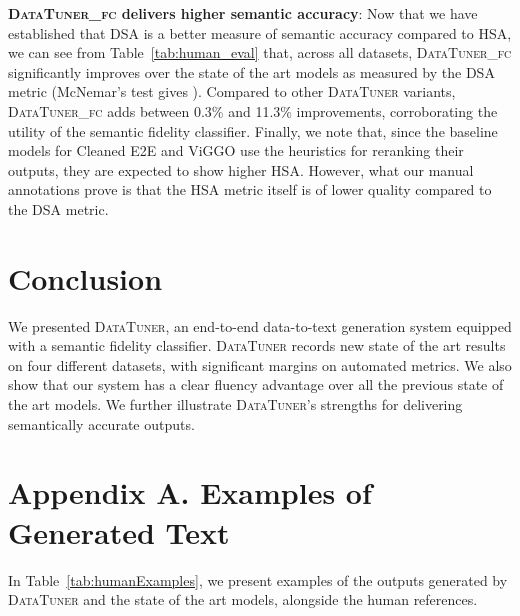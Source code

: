 \documentclass[11pt]{article}
\newcommand{\viggo}{ViGGO\xspace}
\newcommand{\cleanedee}{Cleaned E2E\xspace}
\newcommand{\system}{\textsc{DataTuner}\xspace}
\newcommand{\systemFcPost}{\textsc{DataTuner\_fc}\xspace}
\theoremstyle{definition}
\theoremstyle{break}
\begin{document}
\textbf{\systemFcPost delivers higher semantic accuracy}: 
Now that we have established that DSA is a better measure of semantic accuracy compared to HSA, we can see from Table~\ref{tab:human_eval} that, across all datasets, \systemFcPost significantly improves over the state of the art models as measured by the DSA metric (McNemar's test gives ). Compared to other \system variants, \systemFcPost adds between 0.3\% and 11.3\% improvements, corroborating the utility of the semantic fidelity classifier.
Finally, we note that, since the baseline models for \cleanedee and \viggo use the heuristics for reranking their outputs, they are expected to show higher HSA. However, what our manual annotations prove is that the HSA metric itself is of lower quality compared to the DSA metric.






\section{Conclusion}
We presented \system, an end-to-end data-to-text generation system equipped with a semantic fidelity classifier. \system records new state of the art results on four different datasets, with significant margins on automated metrics. We also show that our system has a clear fluency advantage over all the previous state of the art models. We further illustrate \system's strengths for delivering semantically accurate outputs.






\clearpage

\section*{Appendix A. Examples of Generated Text}


In Table~\ref{tab:humanExamples}, we present examples of the outputs generated by \system and the state of the art models, alongside the human references.
\end{document}

